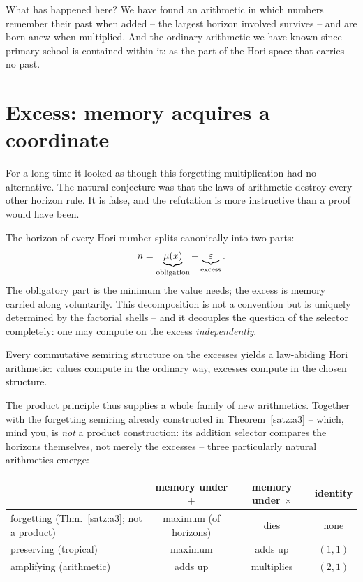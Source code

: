 \begin{oberflaeche}
What has happened here? We have found an arithmetic in which
numbers remember their past when added -- the largest horizon
involved survives -- and are born anew when multiplied. And the
ordinary arithmetic we have known since primary school is contained
within it: as the part of the Hori space that carries no past.
\end{oberflaeche}

\section{Excess: memory acquires a coordinate}

For a long time it looked as though this forgetting multiplication
had no alternative. The natural conjecture was that the laws of
arithmetic destroy every other horizon rule. It is false, and the
refutation is more instructive than a proof would have been.

The horizon of every Hori number splits canonically into two parts:
\[
n=\underbrace{\mu(x)}_{\text{obligation}}
 +\underbrace{\varepsilon}_{\text{excess}} .
\]
The obligatory part is the minimum the value needs; the excess is
memory carried along voluntarily. This decomposition is not a
convention but is uniquely determined by the factorial shells --
and it decouples the question of the selector completely: one may
compute on the excess \emph{independently}.

\begin{satz}\label{satz:produktprinzip}
Every commutative semiring structure on the excesses yields a
law-abiding Hori arithmetic: values compute in the ordinary way,
excesses compute in the chosen structure.
\end{satz}

The product principle thus supplies a whole family of new
arithmetics. Together with the forgetting semiring already
constructed in Theorem~\ref{satz:a3} -- which, mind you, is
\emph{not} a product construction: its addition selector compares
the horizons themselves, not merely the excesses -- three
particularly natural arithmetics emerge:

\begin{center}
\small
\begin{tabular}{lccc}
 & memory under $+$ & memory under $\times$ & identity \\
\hline
forgetting (Thm.~\ref{satz:a3}; not a product) & maximum (of horizons) & dies & none \\
preserving (tropical) & maximum & adds up & $(1,1)$ \\
amplifying (arithmetic) & adds up & multiplies & $(2,1)$ \\
\end{tabular}
\end{center}

